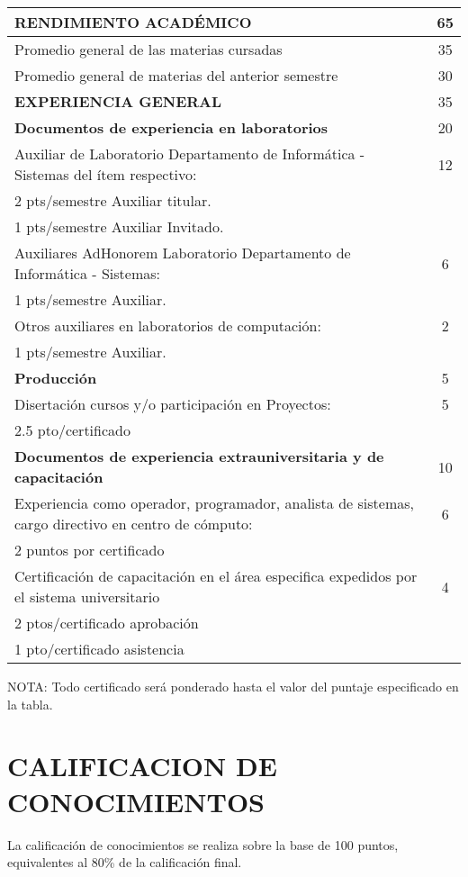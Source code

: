 \documentclass[letterpaper,11pt]{article}
\begin{document}
\begin{tabular}{|p{14cm}|c|}
\hline
 \textbf{RENDIMIENTO ACADÉMICO} & 65 \\
\hline
 Promedio general de las materias cursadas & 35 \\
\hline
 Promedio general de materias del anterior semestre & 30 \\
\hline
 \textbf{EXPERIENCIA GENERAL} & 35 \\
\hline
 \textbf{Documentos de experiencia en laboratorios} & 20 \\
\hline
 Auxiliar de Laboratorio Departamento de Informática - Sistemas del ítem respectivo: & 12 \\
\hline
 2 pts/semestre Auxiliar titular. &  \\
\hline
 1 pts/semestre Auxiliar Invitado. &  \\
\hline
 Auxiliares AdHonorem Laboratorio Departamento de Informática - Sistemas: & 6 \\
\hline
 1 pts/semestre Auxiliar. &  \\
\hline
 Otros auxiliares en laboratorios de computación: & 2 \\
\hline
 1 pts/semestre Auxiliar. &  \\
\hline
 \textbf{Producción} & 5 \\
\hline
 Disertación cursos y/o participación en Proyectos: & 5 \\
\hline
 2.5 pto/certificado &  \\
\hline
 \textbf{Documentos de experiencia extrauniversitaria y de capacitación} & 10 \\
\hline
 Experiencia como operador, programador, analista de sistemas, cargo directivo en centro de cómputo: & 6 \\
\hline
 2 puntos por certificado &  \\
\hline
 Certificación de capacitación en el área especifica expedidos por el sistema universitario & 4 \\
\hline
 2 ptos/certificado aprobación &  \\
\hline
 1 pto/certificado asistencia &  \\
\hline
\end{tabular}

NOTA: Todo certificado será ponderado hasta el valor del puntaje especificado en la tabla.

\section{CALIFICACION DE CONOCIMIENTOS}
La calificación de conocimientos se realiza sobre la base de 100 puntos, equivalentes al 80\% de la calificación final.
\end{document}
